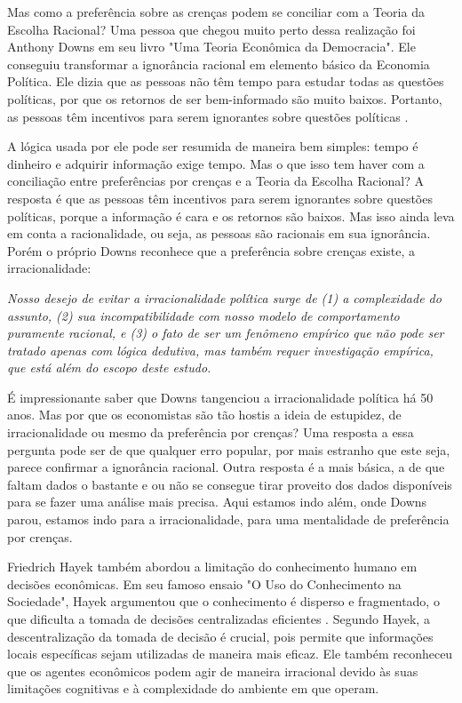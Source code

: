 Mas como a preferência sobre as crenças podem se conciliar com a Teoria da Escolha Racional? Uma pessoa que chegou muito perto dessa realização foi Anthony Downs em seu livro "Uma Teoria Econômica da Democracia". Ele conseguiu transformar a ignorância racional em elemento básico da Economia Política. Ele dizia que as pessoas não têm tempo para estudar todas as questões políticas, por que os retornos de ser bem-informado são muito baixos. Portanto, as pessoas têm incentivos para serem ignorantes sobre questões políticas \cite{downs1957economic}.

A lógica usada por ele pode ser resumida de maneira bem simples: tempo é dinheiro e adquirir informação exige tempo. Mas o que isso tem haver com a conciliação entre preferências por crenças e a Teoria da Escolha Racional? A resposta é que as pessoas têm incentivos para serem ignorantes sobre questões políticas, porque a informação é cara e os retornos são baixos. Mas isso ainda leva em conta a racionalidade, ou seja, as pessoas são racionais em sua ignorância. Porém o próprio Downs reconhece que a preferência sobre crenças existe, a irracionalidade:

\begin{citacao}
    \textit{
        Nosso desejo de evitar a irracionalidade política surge de (1) a complexidade do assunto, (2) sua incompatibilidade com nosso modelo de comportamento puramente racional, e (3) o fato de ser um fenômeno empírico que não pode ser tratado apenas com lógica dedutiva, mas também requer investigação empírica, que está além do escopo deste estudo.
    } \newline
    \cite{downs1957economic}
\end{citacao}

É impressionante saber que Downs tangenciou a irracionalidade política há 50 anos. Mas por que os economistas são tão hostis a ideia de estupidez, de irracionalidade ou mesmo da preferência por crenças? Uma resposta a essa pergunta pode ser de que qualquer erro popular, por mais estranho que este seja, parece confirmar a ignorância racional. Outra resposta é a mais básica, a de que faltam dados o bastante e ou não se consegue tirar proveito dos dados disponíveis para se fazer uma análise mais precisa. Aqui estamos indo além, onde Downs parou, estamos indo para a irracionalidade, para uma mentalidade de preferência por crenças.

Friedrich Hayek também abordou a limitação do conhecimento humano em decisões econômicas. Em seu famoso ensaio "O Uso do Conhecimento na Sociedade", Hayek argumentou que o conhecimento é disperso e fragmentado, o que dificulta a tomada de decisões centralizadas eficientes \cite{hayek_knowledge_use}. Segundo Hayek, a descentralização da tomada de decisão é crucial, pois permite que informações locais específicas sejam utilizadas de maneira mais eficaz. Ele também reconheceu que os agentes econômicos podem agir de maneira irracional devido às suas limitações cognitivas e à complexidade do ambiente em que operam.

